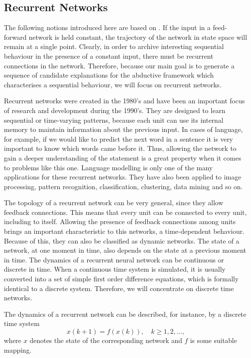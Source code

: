 \subsection{Recurrent Networks}
\label{sec:preliminaries:rcn}

The following notions introduced here are based on \cite{hertz1991introduction, medsker1999recurrent}. If the input in a feed-forward network is held constant, the trajectory of the network in state space will remain at a single point. Clearly, in order to archive interesting sequential behaviour in the presence of a constant input, there must be recurrent connections in the network. Therefore, because our main goal is to generate a sequence of candidate explanations for the abductive framework which characterises a sequential behaviour, we will focus on recurrent networks.

Recurrent networks were created in the 1980's and have been an important focus of research and development during the 1990's. They are designed to learn sequential or time-varying patterns, because each unit can use its internal memory to maintain information about the previous input. In cases of language, for example, if we would like to predict the next word in a sentence it is very important to know which words came before it. Thus, allowing the network to gain a deeper understanding of the statement is a great property when it comes to problems like this one. Language modelling is only one of the many applications for these recurrent networks. They have also been applied to image processing, pattern recognition, classification, clustering, data mining and so on.

The topology of a recurrent network can be very general, since they allow feedback connections. This means that every unit can be connected to every unit, including to itself. Allowing the presence of feedback connections among units brings an important characteristic to this networks, a time-dependent behaviour. Because of this, they can also be classified as dynamic networks. The state of a network, at one moment in time, also depends on the state at a previous moment in time. The dynamics of a recurrent neural network can be continuous or discrete in time. When a continuous time system is simulated, it is usually converted into a set of simple first order difference equations, which is formally identical to a discrete system. Therefore, we will concentrate on discrete time networks.

The dynamics of a recurrent network can be described, for instance, by a discrete time system 
\[
x(k + 1) = f(x(k)), \quad k \geq 1, 2,...,
\]
where $x$ denotes the state of the corresponding network and $f$ is some suitable mapping. 


